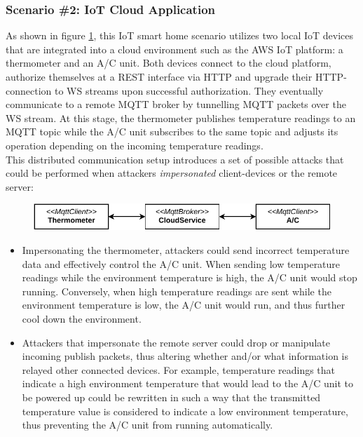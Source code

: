 \subsubsection{Scenario \#2: \ac{IoT} Cloud Application}
\label{par:scenario-2} As shown in figure \ref{fig:arch-smart-home}, this \ac{IoT} smart home scenario utilizes two local \ac{IoT} devices that are integrated into a cloud environment such as the \ac{AWS} \ac{IoT} platform: a thermometer and an \ac{A/C} unit. Both devices connect to the cloud platform, authorize themselves at a \ac{REST} interface via \ac{HTTP} and upgrade their \ac{HTTP}-connection to \ac{WS} streams upon successful authorization. They eventually communicate to a remote \ac{MQTT} broker by tunnelling \ac{MQTT} packets over the \ac{WS} stream. At this stage, the thermometer publishes temperature readings to an \ac{MQTT} topic while the \ac{A/C} unit subscribes to the same topic and adjusts its operation depending on the incoming temperature readings. \\
This distributed communication setup introduces a set of possible attacks that could be performed when attackers \emph{impersonated} client-devices or the remote server:
\begin{figure}[h]
    \centering
    \includegraphics{img/ch04/Scenario_SmartHome.pdf}
    \label{fig:arch-smart-home}
\end{figure}
\begin{itemize}
    \item Impersonating the thermometer, attackers could send incorrect temperature data and effectively control the \ac{A/C} unit. When sending low temperature readings while the environment temperature is high, the \ac{A/C} unit would stop running. Conversely, when high temperature readings are sent while the environment temperature is low, the \ac{A/C} unit would run, and thus further cool down the environment.
    \item Attackers that impersonate the remote server could drop or manipulate incoming publish packets, thus altering whether and/or what information is relayed other connected devices. For example, temperature readings that indicate a high environment temperature that would lead to the \ac{A/C} unit to be powered up could be rewritten in such a way that the transmitted temperature value is considered to indicate a low environment temperature, thus preventing the \ac{A/C} unit from running automatically.
\end{itemize}

